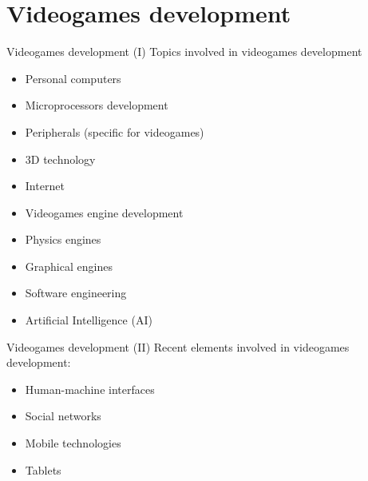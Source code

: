 \documentclass[10pt,compress]{beamer} %
\begin{document}
\section{Videogames development}
\begin{frame}{Videogames development (I)}
	Topics involved in videogames development
	\begin{itemize}
		\item Personal computers
		\item Microprocessors development
		\item Peripherals (specific for videogames)
		\item 3D technology
		\item Internet
		\item Videogames engine development
		\item Physics engines
		\item Graphical engines
		\item Software engineering
		\item Artificial Intelligence (AI)
	\end{itemize}
\end{frame}

\begin{frame}{Videogames development (II)}
	Recent elements involved in videogames development:
	\begin{itemize}
		\item Human-machine interfaces
		\item Social networks
		\item Mobile technologies
		\item Tablets
	\end{itemize}
\end{frame}
\end{document}
